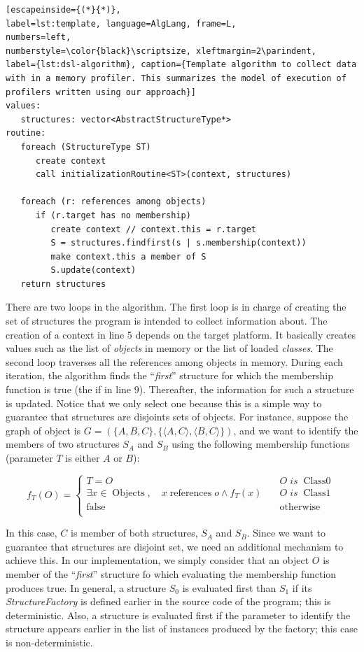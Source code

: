 \begin{lstlisting}[escapeinside={(*}{*)},
label=lst:template, language=AlgLang, frame=L,
numbers=left,
numberstyle=\color{black}\scriptsize, xleftmargin=2\parindent,
label={lst:dsl-algorithm}, caption={Template algorithm to collect data with in a memory profiler. This summarizes the model of execution of profilers written using our approach}]
values:
   structures: vector<AbstractStructureType*>
routine:
   foreach (StructureType ST)
	  create context
	  call initializationRoutine<ST>(context, structures)
   
   foreach (r: references among objects)
      if (r.target has no membership)
         create context // context.this = r.target
         S = structures.findfirst(s | s.membership(context))
         make context.this a member of S
         S.update(context)
   return structures 
\end{lstlisting}


There are two loops in the algorithm. 
The first loop is in charge of creating the set of structures the program is intended to collect information about.
The creation of a context in line 5 depends on the target platform.
It basically creates values such as the list of \textit{objects} in memory or the list of loaded \textit{classes}.
The second loop traverses all the references among objects in memory.
During each iteration, the algorithm finds the ``\textit{first}'' structure for which the membership function is true (the if in line 9).
Thereafter, the information for such a structure is updated.
Notice that we only select one because this is a simple way to guarantee that structures are disjoints sets of objects.
For instance, suppose the graph of object is $G=\left( \{ A, B, C \} , \{ \langle A,C \rangle, \langle B,C \rangle \} \right)$, and we want to identify the members of two structures $S_A$ and $S_B$ using the following membership functions (parameter $T$ is either $A$ or $B$):

\[
	f_T\left(O\right) = 
	\begin{cases}
		T = O & \quad O \; is \; \operatorname{Class0} \\
		\exists {x \in \operatorname{Objects}}, \quad x \operatorname{references} o \wedge f_T\left(x\right) & \quad O \; is \; \operatorname{Class1} \\
		\operatorname{false} & \quad \operatorname{otherwise} \\
	\end{cases}
\]

In this case, $C$ is member of both structures, $S_A$ and $S_B$.
Since we want to guarantee that structures are disjoint set, we need an additional mechanism to achieve this.
In our implementation, we simply consider that an object $O$ is member of the ``\textit{first}'' structure fo which evaluating the membership function produces true.
In general, a structure $S_0$ is evaluated first than $S_1$ if its \textit{StructureFactory} is defined earlier in the source code of the program; this is deterministic.
Also, a structure is evaluated first if the parameter to identify the structure appears earlier in the list of instances produced by the factory; this case is non-deterministic.

